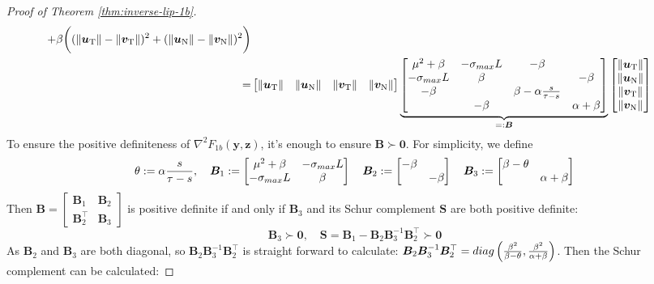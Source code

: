 \documentclass[10pt,a4paper]{amsart}
\def\mB{{\bm{B}}}
\def\mS{{\bm{S}}}
\def\vu{{\bm{u}}}
\def\vv{{\bm{v}}}
\def\vy{{\bm{y}}}
\def\vz{{\bm{z}}}
\def\vzero{{\bm{0}}}
\begin{document}
\begin{proof}[Proof of Theorem \ref{thm:inverse-lip-1b}]
\begin{align*}
+ \beta \bigg( ( \|\vu_{\mathrm{T}}\| - \|\vv_{\mathrm{T}}\| )^2 + ( \|\vu_{\mathrm{N}}\| - \| \vv_{\mathrm{N}}\| )^2 \bigg) \\
= & \begin{bmatrix}
\|\vu_{\mathrm{T}}\| & \|\vu_{\mathrm{N}}\| & \|\vv_{\mathrm{T}}\| & \|\vv_{\mathrm{N}}\|
\end{bmatrix}
\underbrace{\begin{bmatrix}
\mu^2 + \beta & - \sigma_{\textup{max}} L & - \beta & \\
- \sigma_{\textup{max}} L & \beta & & -\beta \\
-\beta & & \beta - \alpha \frac{s}{\tau-s} & \\
& - \beta & & \alpha + \beta 
\end{bmatrix}}_{=:\mB}
\begin{bmatrix}
\|\vu_{\mathrm{T}}\| \\ \|\vu_{\mathrm{N}}\| \\ \|\vv_{\mathrm{T}}\| \\ \|\vv_{\mathrm{N}}\|
\end{bmatrix}
\end{align*}
To ensure the positive definiteness of $\nabla^2F_{1b}(\vy,\vz)$, it's enough to ensure $\mB \succ \vzero$. For simplicity, we define
\[
\theta := \alpha \frac{s}{\tau-s}, \quad 
\mB_{1}:= \begin{bmatrix}
\mu^2 + \beta & - \sigma_{\textup{max}} L \\
- \sigma_{\textup{max}} L & \beta 
\end{bmatrix}
\quad \mB_{2}:= \begin{bmatrix}
 - \beta & \\
 & -\beta 
\end{bmatrix}
\quad \mB_{3}:= \begin{bmatrix}
 \beta - \theta & \\
 & \alpha + \beta 
\end{bmatrix}\]
Then $\mB = \begin{bmatrix}
\mB_1 & \mB_2 \\ 
\mB_2^\top & \mB_3
\end{bmatrix}$ is positive definite if and only if $\mB_3$ and its Schur complement $\mS$ are both positive definite:
\[ \mB_3 \succ \vzero ,\quad \mS = \mB_1 - \mB_2 \mB_3^{-1} \mB_2^\top \succ \vzero\] 
As $\mB_2$ and $\mB_3$ are both diagonal, so $\mB_2 \mB_3^{-1} \mB_2^\top$ is straight forward to calculate: $\mB_2 \mB_3^{-1} \mB_2^\top = \textup{diag}\left(\frac{\beta^2}{\beta-\theta}, \frac{\beta^2}{\alpha+\beta}\right)$. Then the Schur complement can be calculated:

\end{proof}
\end{document}
